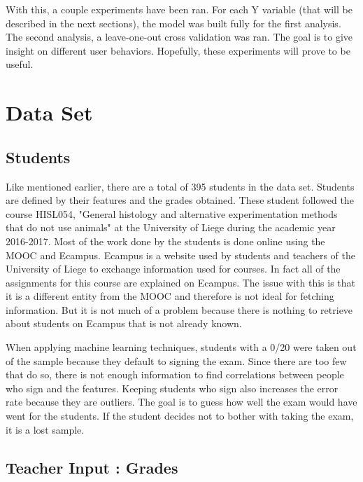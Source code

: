 \documentclass[a4paper,11pt]{report}
\numberwithin{figure}{section} %
\begin{document}
    With this, a couple experiments have been ran.
    For each Y variable (that will be described in the next sections), the model was built fully for the first analysis.
    The second analysis, a leave-one-out cross validation was ran.
    The goal is to give insight on different user behaviors.
    Hopefully, these experiments will prove to be useful.

    \section{Data Set} \label{Data_Set}

    	\subsection{Students}
    Like mentioned earlier, there are a total of 395 students in the data set.
    Students are defined by their features and the grades obtained.
    These student followed the course HISL054, "General histology and alternative experimentation methods that do not use animals" at the University of Liege during the academic year 2016-2017.
    Most of the work done by the students is done online using the MOOC and Ecampus.
    Ecampus is a website used by students and teachers of the University of Liege to exchange information used for courses.
    In fact all of the assignments for this course are explained on Ecampus.
    The issue with this is that it is a different entity from the MOOC and therefore is not ideal for fetching information.
    But it is not much of a problem because there is nothing to retrieve about students on Ecampus that is not already known.\newline

    When applying machine learning techniques, students with a 0/20 were taken out of the sample because they default to signing the exam.
    Since there are too few that do so, there is not enough information to find correlations between people who sign and the features.
    Keeping students who sign also increases the error rate because they are outliers.
    The goal is to guess how well the exam would have went for the students.
    If the student decides not to bother with taking the exam, it is a lost sample.\newline

    	\subsection{Teacher Input : Grades}
\end{document}
